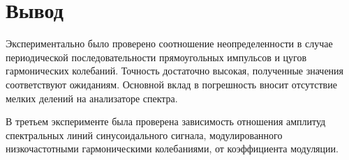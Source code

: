 \documentclass[a4paper, 12pt,twoside]{article}
\begin{document}
\section{Вывод}

Экспериментально было проверено соотношение неопределенности в случае периодической последовательности прямоугольных импульсов и цугов гармонических колебаний. Точность достаточно высокая, полученные значения соответствуют ожиданиям. Основной вклад в погрешность вносит отсутствие мелких делений на анализаторе спектра.

В третьем эксперименте была проверена зависимость отношения амплитуд спектральных линий синусоидального сигнала, модулированного низкочастотными гармоническими колебаниями, от коэффициента модуляции.
\end{document}
